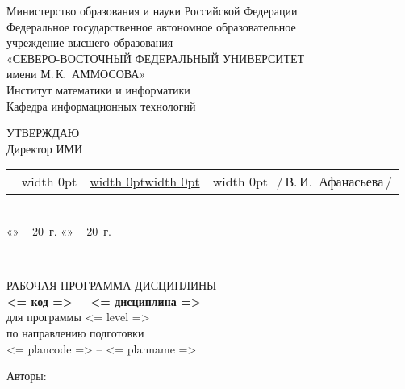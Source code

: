 \documentclass[a4paper,12pt]{article}
\makeatletter
\newcommand{\ulfield}[3]{
  \noindent
  \begin{tabularx}{\linewidth}{@{}l@{}X@{}l@{}}
  #1\if\relax\detokenize{#1}\relax\else\,~\vrule width 0pt\fi 
  & \uline{\vrule width 0pt\hfill#2\hfill\vrule width 0pt} & 
  \if\relax\detokenize{#3}\relax\else\vrule width 0pt~\,\fi #3
  \end{tabularx}
  }
\newcommand{\datefield}[1][]{\if
  \relax\detokenize{#1}\relax
  «\uline{\hspace{22pt}}»~\uline{\hspace{90pt}}\,~20\uline{\hspace{20pt}}~г.\else 
  «\uline{\hspace{18pt}}»~\uline{\hspace{60pt}}\,~20\uline{\hspace{18pt}}~г.\fi
  }
\makeatother
\begin{document}
\sloppy
\thispagestyle{empty}

\noindent
\begin{center}
Министерство образования и науки Российской Федерации \\
Федеральное государственное автономное образовательное \\
учреждение высшего образования\\
«СЕВЕРО-ВОСТОЧНЫЙ ФЕДЕРАЛЬНЫЙ УНИВЕРСИТЕТ \\
имени М.\,К.~АММОСОВА» \\
Институт математики и информатики \\
Кафедра информационных технологий

\vspace{12mm}
\begin{flushright}
\parbox{80mm}{
УТВЕРЖДАЮ\\
Директор ИМИ\\[2mm]
\ulfield{}{}{/\,В.\,И.~Афанасьева\,/}{}\\
\datefield
\\[20mm]
}
\end{flushright}


РАБОЧАЯ ПРОГРАММА ДИСЦИПЛИНЫ
\\[2mm]
\textbf{<= код =>\ -- <= дисциплина =>} 
\\[5mm]

для программы <= level =>\\
по направлению подготовки \\
<= plancode => -- <= planname =>
\\[15mm]

\parbox{\textwidth}{
Авторы: %
}
\bigskip


\end{center}
\end{document}
